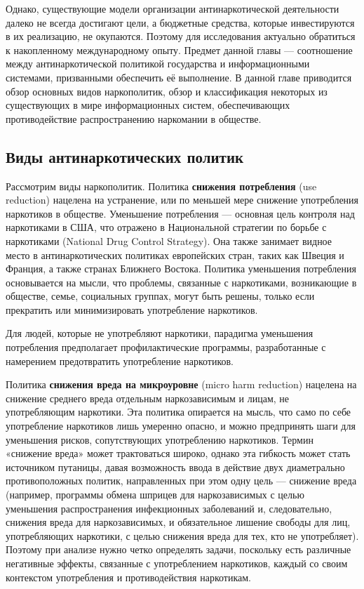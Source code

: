 Однако, существующие модели организации антинаркотической деятельности далеко не 
всегда достигают цели, а бюджетные средства, которые инвестируются в их 
реализацию, не окупаются. Поэтому для исследования актуально обратиться к 
накопленному международному опыту. Предмет данной главы — соотношение между 
антинаркотической политикой государства и информационными системами, призванными 
обеспечить её выполнение. В данной главе приводится обзор основных видов 
наркополитик, обзор и классификация некоторых из существующих в мире 
информационных систем, обеспечивающих противодействие распространению наркомании 
в обществе.

\subsection{Виды антинаркотических политик}

Рассмотрим виды наркополитик. Политика \textbf{снижения потребления} (use 
reduction) нацелена на устранение, или по меньшей мере снижение употребления 
наркотиков в обществе. Уменьшение потребления —  основная цель контроля над 
наркотиками в США, что отражено в Национальной стратегии по борьбе с наркотиками 
(National Drug Control Strategy)\cite{us_nat_drug_strat}. Она также занимает 
видное место в антинаркотических политиках европейских стран, таких как Швеция и 
Франция, а также странах Ближнего Востока. Политика уменьшения потребления 
основывается на мысли, что проблемы, связанные с наркотиками,  возникающие в 
обществе, семье, социальных группах, могут быть решены, только если прекратить 
или минимизировать употребление наркотиков. 

Для людей, которые не употребляют наркотики, парадигма уменьшения потребления 
предполагает профилактические программы, разработанные с намерением 
предотвратить употребление наркотиков.

Политика \textbf{снижения вреда на микроуровне} (micro harm reduction) нацелена 
на снижение среднего вреда отдельным наркозависимым и лицам, не употребляющим 
наркотики. Эта политика опирается на мысль, что само по себе употребление 
наркотиков лишь умеренно опасно, и можно предпринять шаги для уменьшения рисков, 
сопутствующих употреблению наркотиков. Термин «снижение вреда» может 
трактоваться широко, однако эта гибкость может стать источником путаницы, давая 
возможность ввода в действие двух диаметрально противоположных политик, 
направленных при этом одну цель — снижение вреда (например, программы обмена 
шприцев для наркозависимых с целью уменьшения распространения инфекционных 
заболеваний и, следовательно, снижения вреда для наркозависимых, и обязательное 
лишение свободы для лиц, употребляющих наркотики, с целью снижения вреда для 
тех, кто не употребляет). Поэтому при анализе нужно четко определять задачи, 
поскольку есть различные негативные эффекты, связанные с употреблением 
наркотиков, каждый со своим контекстом употребления и противодействия 
наркотикам.

